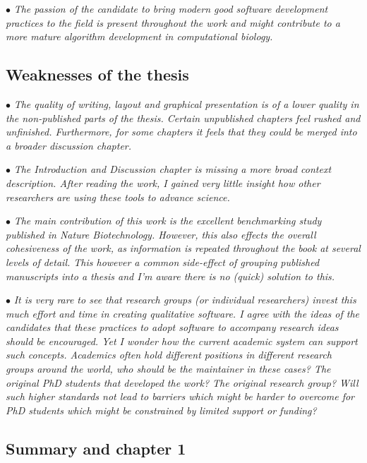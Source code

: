 \documentclass[10pt]{article}
\newcommand{\exam}[2][\  ]{\hspace{0pt}\marginpar{\color{red}#1}$\bullet$ \textit{#2}}
\newcommand{\imp}[1]{{\color{red} #1}}
\newcommand{\nimp}[1]{{\color{gray} #1}}
\newcommand{\bigexclaim}{\raisebox{-0.1em}{\BigTriangleUp}\hspace{-0.32em}\llap{\small\textbf{!}}\hspace{0.32em}}
\newcommand{\tagimp}{\bigexclaim}
\newcommand{\tagtime}{{\Large $\hourglass$}}
\begin{document}
{\exam{\nimp{The passion of the candidate to bring modern good software development
	practices to the field is present throughout the work and might contribute to a
	more mature algorithm development in computational biology.}}



\subsection{Weaknesses of the thesis}
\exam[\tagimp \tagtime]{\imp{The quality of writing, layout and graphical presentation is of a lower quality in the non-published parts of the thesis. Certain unpublished chapters feel rushed and unfinished. Furthermore, for some chapters it feels that they could be merged into a broader discussion chapter.}}

\exam[\tagimp \tagtime]{\imp{The Introduction and Discussion chapter is missing a more broad context
	description. After reading the work, I gained very little insight how other
	researchers are using these tools to advance science.}}


\exam{\nimp{The main contribution of this work is the excellent benchmarking study
	published in Nature Biotechnology.} However, this also effects the overall
	cohesiveness of the work, as information is repeated throughout the book at
	several levels of detail. \nimp{This however a common side-effect of grouping
	published manuscripts into a thesis and I’m aware there is no (quick) solution
	to this.}}

\exam[\tagimp]{\nimp{It is very rare to see that research groups (or individual researchers) invest this
	much effort and time in creating qualitative software. I agree with the ideas of
	the candidates that these practices to adopt software to accompany research
	ideas should be encouraged.} Yet I wonder how the current academic system
	can support such concepts. Academics often hold different positions in
	different research groups around the world, who should be the maintainer in
	these cases? The original PhD students that developed the work? The original
	research group? Will such higher standards not lead to barriers which might
	be harder to overcome for PhD students which might be constrained by limited
	support or funding?}


\subsection{Summary and chapter 1}

}
\end{document}
